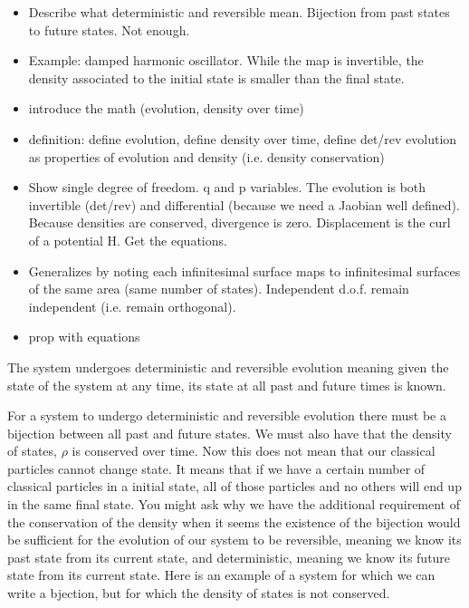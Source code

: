\documentclass{article}
\begin{document}
\begin{itemize}
	\item Describe what deterministic and reversible mean. Bijection from past states to future states. Not enough.
	
	\item Example: damped harmonic oscillator. While the map is invertible, the density associated to the initial state is smaller than the final state.
	
	\item introduce the math (evolution, density over time)
	
	\item definition: define evolution, define density over time, define det/rev evolution as properties of evolution and density (i.e. density conservation)
	
	\item Show single degree of freedom. q and p variables. The evolution is both invertible (det/rev) and differential (because we need a Jaobian well defined). Because densities are conserved, divergence is zero. Displacement is the curl of a potential H. Get the equations.
	
	\item Generalizes by noting each infinitesimal surface maps to infinitesimal surfaces of the same area (same number of states). Independent d.o.f. remain independent (i.e. remain orthogonal).
	
	\item prop with equations
	
\end{itemize}


\begin{assump}
	The system undergoes deterministic and reversible evolution meaning given the state of the system at any time, its state at all past and future times is known.
\end{assump}

	For a system to undergo deterministic and reversible evolution there must be a bijection between all past and future states. We must also have that the density of states, $\rho$ is conserved over time. Now this does not mean that our classical particles cannot change state. It means that if we have a certain number of classical particles in a initial state, all of those particles and no others will end up in the same final state. You might ask why we have the additional requirement of the conservation of the density when it seems the existence of the bijection would be sufficient for the evolution of our system to be reversible, meaning we know its past state from its current state, and deterministic, meaning we know its future state from its current state. Here is an example of a system for which we can write a bjection, but for which the density of states is not conserved.
	
\end{document}
